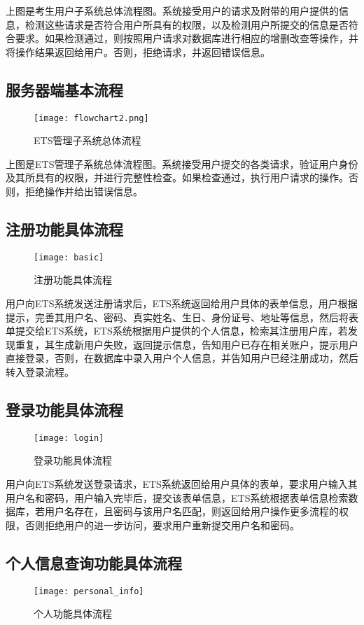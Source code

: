 上图是考生用户子系统总体流程图。系统接受用户的请求及附带的用户提供的信息，检测这些请求是否符合用户所具有的权限，以及检测用户所提交的信息是否符合要求。如果检测通过，则按照用户请求对数据库进行相应的增删改查等操作，并将操作结果返回给用户。否则，拒绝请求，并返回错误信息。

\subsection{服务器端基本流程}
\begin{figure}[ht]
\centering
\texttt{[image: flowchart2.png]}
\caption{ETS管理子系统总体流程} \label{fig:figure3}
\end{figure}

上图是ETS管理子系统总体流程图。系统接受用户提交的各类请求，验证用户身份及其所具有的权限，并进行完整性检查。如果检查通过，执行用户请求的操作。否则，拒绝操作并给出错误信息。

\subsection{注册功能具体流程}
\begin{figure}[ht]
\centering
\texttt{[image: basic]}
\caption{注册功能具体流程} \label{fig:figure4}
\end{figure}

用户向ETS系统发送注册请求后，ETS系统返回给用户具体的表单信息，用户根据提示，完善其用户名、密码、真实姓名、生日、身份证号、地址等信息，然后将表单提交给ETS系统，ETS系统根据用户提供的个人信息，检索其注册用户库，若发现重复，其生成新用户失败，返回提示信息，告知用户已存在相关账户，提示用户直接登录，否则，在数据库中录入用户个人信息，并告知用户已经注册成功，然后转入登录流程。

\subsection{登录功能具体流程}
\begin{figure}[ht]
\centering
\texttt{[image: login]}
\caption{登录功能具体流程} \label{fig:figure5}
\end{figure}

用户向ETS系统发送登录请求，ETS系统返回给用户具体的表单，要求用户输入其用户名和密码，用户输入完毕后，提交该表单信息，ETS系统根据表单信息检索数据库，若用户名存在，且密码与该用户名匹配，则返回给用户操作更多流程的权限，否则拒绝用户的进一步访问，要求用户重新提交用户名和密码。

\subsection{个人信息查询功能具体流程}
\begin{figure}[ht]
\centering
\texttt{[image: personal\_info]}
\caption{个人功能具体流程} \label{fig:figure6}
\end{figure}

